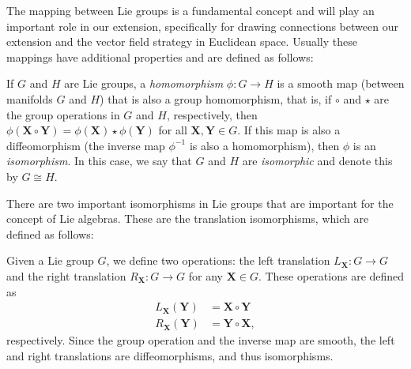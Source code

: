 The mapping between Lie groups is a fundamental concept and will play an important role in our extension, specifically for drawing connections between our extension and the vector field strategy in Euclidean space. Usually these mappings have additional properties and are defined as follows:
\begin{definition}
    If $G$ and $H$ are Lie groups, a \emph{homomorphism} $\phi: G\to H$ is a smooth map (between manifolds $G$ and $H$) that is also a group homomorphism, that is, if $\circ$ and $\star$ are the group operations in $G$ and $H$, respectively, then $\phi(\mathbf{X}\circ\mathbf{Y}) = \phi(\mathbf{X})\star\phi(\mathbf{Y})$ for all $\mathbf{X},\mathbf{Y}\in G$. If this map is also a diffeomorphism (the inverse map $\phi^{-1}$ is also a homomorphism), then $\phi$ is an \emph{isomorphism}. In this case, we say that $G$ and $H$ are \emph{isomorphic} and denote this by $G\cong H$.
\end{definition}

There are two important isomorphisms in Lie groups that are important for the concept of Lie algebras. These are the translation isomorphisms, which are defined as follows:
\begin{definition}
    Given a Lie group $G$, we define two operations: the left translation $L_{\mathbf{X}}: G\to G$ and the right translation $R_{\mathbf{X}}: G\to G$ for any $\mathbf{X}\in G$. These operations are defined as 
    \begin{align}
        L_{\mathbf{X}}(\mathbf{Y}) &= \mathbf{X}\circ\mathbf{Y}\\
        R_{\mathbf{X}}(\mathbf{Y}) &= \mathbf{Y}\circ\mathbf{X},
    \end{align}
    respectively. Since the group operation and the inverse map are smooth, the left and right translations are diffeomorphisms, and thus isomorphisms.
\end{definition}

